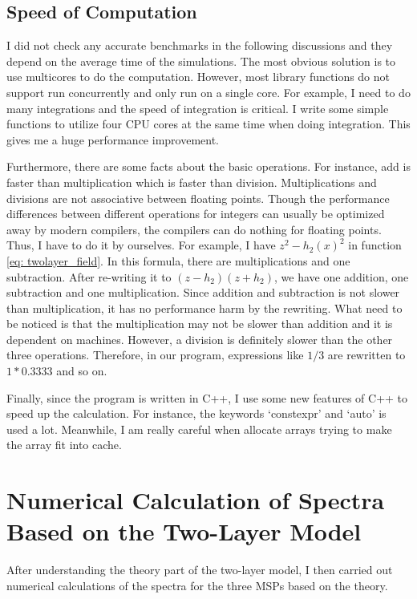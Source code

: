 \documentclass[a4paper, 12pt]{report}
\begin{document}
    \subsection{Speed of Computation}
      I did not check any accurate benchmarks in the following discussions and they 
      depend on the average time of the simulations.
      The most obvious solution is to use multicores to do the computation. However, 
      most library functions do not support run concurrently and only run on a single core. 
      For example, I need to do many integrations and the speed of integration is critical. 
      I write some simple functions to utilize four CPU cores at the same time when doing 
      integration. This gives me a huge performance improvement.

      Furthermore, there are some facts about the basic operations. For instance, add is 
      faster than multiplication which is faster than division. Multiplications and divisions 
      are not associative between floating points. Though the performance differences between 
      different operations for integers can usually be optimized away by modern compilers, 
      the compilers can do nothing for floating points. Thus, I have to do it by ourselves. 
      For example, I have $z^2 - h_2\left(x\right)^2$ in function \ref{eq: twolayer_field}.
      In this formula, there are multiplications and one subtraction. After re-writing it to 
      $\left(z-h_2\right)\left(z + h_2\right)$, we have one addition, one subtraction and one 
      multiplication. Since addition and subtraction is not slower than multiplication, it 
      has no performance harm by the rewriting. What need to be noticed is that the 
      multiplication may not be slower than addition
      and it is dependent on machines. However, a division is definitely slower than the other three operations. 
      Therefore, in our program, expressions like $1 / 3$ are rewritten to $1*0.3333$ and so on.  

      Finally, since the program is written in C++, I use some new features of C++ to speed
      up the calculation. For instance, the keywords `constexpr' and `auto' is used a lot. 
      Meanwhile, I am really careful when allocate arrays trying to make the array fit into
      cache. 

  \section{Numerical Calculation of Spectra Based on the Two-Layer Model}
    After understanding the theory part of the two-layer model, 
    I then carried out numerical calculations of the spectra for the three MSPs
    based on the theory.  
\end{document}
